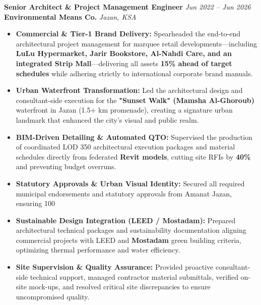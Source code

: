 \documentclass[a4paper,10pt]{article}
\begin{document}
\vspace{4pt}
\textbf{Senior Architect \& Project Management Engineer} \hfill \textit{Jun 2022 -- Jun 2026} \\
\textbf{\color{secondary}Environmental Means Co.} \hfill \textit{Jazan, KSA}
\begin{itemize}
    \item \textbf{Commercial \& Tier-1 Brand Delivery:} Spearheaded the end-to-end architectural project management for marquee retail developments---including \textbf{LuLu Hypermarket, Jarir Bookstore, Al-Nahdi Care, and an integrated Strip Mall}---delivering all assets \textbf{15\% ahead of target schedules} while adhering strictly to international corporate brand manuals.
    \item \textbf{Urban Waterfront Transformation:} Led the architectural design and consultant-side execution for the \textbf{"Sunset Walk" (Mamsha Al-Ghoroub)} waterfront in Jazan (1.5+ km promenade), creating a signature urban landmark that enhanced the city's visual and public realm.
    \item \textbf{BIM-Driven Detailing \& Automated QTO:} Supervised the production of coordinated LOD 350 architectural execution packages and material schedules directly from federated \textbf{Revit models}, cutting site RFIs by \textbf{40\%} and preventing budget overruns.
    \item \textbf{Statutory Approvals \& Urban Visual Identity:} Secured all required municipal endorsements and statutory approvals from Amanat Jazan, ensuring 100%
    \item \textbf{Sustainable Design Integration (LEED / Mostadam):} Prepared architectural technical packages and sustainability documentation aligning commercial projects with LEED and \textbf{Mostadam} green building criteria, optimizing thermal performance and water efficiency.
    \item \textbf{Site Supervision \& Quality Assurance:} Provided proactive consultant-side technical support, managed contractor material submittals, verified on-site mock-ups, and resolved critical site discrepancies to ensure uncompromised quality.
\end{itemize}
\end{document}
